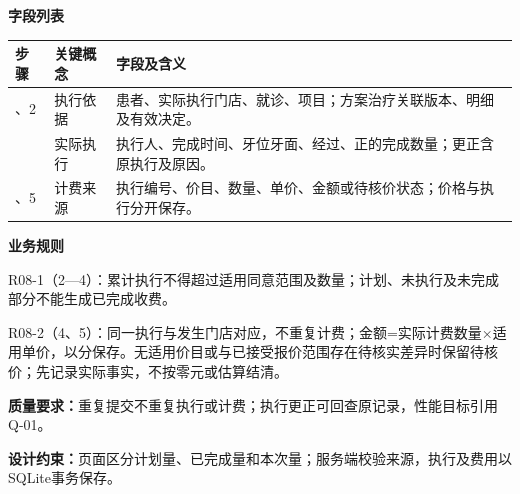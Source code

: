 \documentclass[UTF8,a4paper,zihao=-4,fontset=none]{ctexart}
\begin{document}
\noindent\textbf{字段列表}\par
{\setlength{\tabcolsep}{3pt}\renewcommand{\arraystretch}{1.04}
\noindent\begin{tabular}{@{}>{\raggedright\arraybackslash}p{1.2cm}>{\raggedright\arraybackslash}p{2.2cm}>{\raggedright\arraybackslash}p{12.3cm}@{}}
\toprule
步骤 & 关键概念 & 字段及含义 \\ \midrule
1、2 & 执行依据 & 患者、实际执行门店、就诊、项目；方案治疗关联版本、明细及有效决定。 \\
3 & 实际执行 & 执行人、完成时间、牙位牙面、经过、正的完成数量；更正含原执行及原因。 \\
4、5 & 计费来源 & 执行编号、价目、数量、单价、金额或待核价状态；价格与执行分开保存。 \\
\bottomrule
\end{tabular}\par}
\smallskip
\noindent\textbf{业务规则}\par
\noindent R08-1（2—4）：累计执行不得超过适用同意范围及数量；计划、未执行及未完成部分不能生成已完成收费。\par
\noindent R08-2（4、5）：同一执行与发生门店对应，不重复计费；金额=实际计费数量×适用单价，以分保存。无适用价目或与已接受报价范围存在待核实差异时保留待核价；先记录实际事实，不按零元或估算结清。\par
\smallskip
\noindent\textbf{质量要求：}重复提交不重复执行或计费；执行更正可回查原记录，性能目标引用Q-01。\par
\noindent\textbf{设计约束：}页面区分计划量、已完成量和本次量；服务端校验来源，执行及费用以SQLite事务保存。\par
\endgroup
\clearpage
\end{document}
